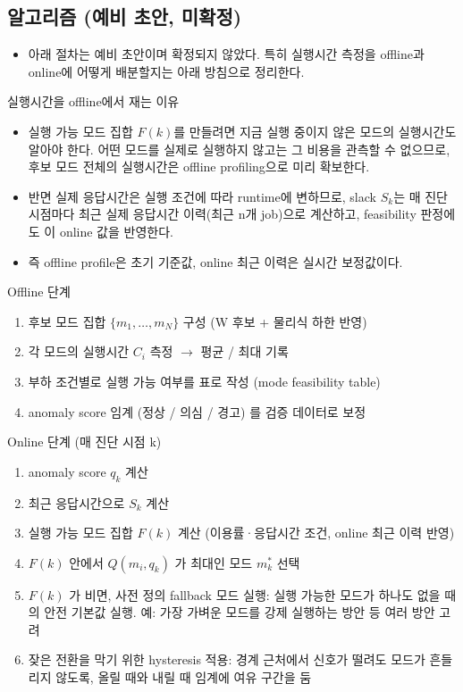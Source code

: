 \documentclass[10pt]{article}
\begin{document}
\subsection{알고리즘 (예비 초안, 미확정)}
\begin{itemize}
\item 아래 절차는 예비 초안이며 확정되지 않았다. 특히 실행시간 측정을 offline과 online에 어떻게 배분할지는 아래 방침으로 정리한다.
\end{itemize}
\noindent 실행시간을 offline에서 재는 이유
\begin{itemize}
\item 실행 가능 모드 집합 $F(k)$를 만들려면 지금 실행 중이지 않은 모드의 실행시간도 알아야 한다. 어떤 모드를 실제로 실행하지 않고는 그 비용을 관측할 수 없으므로, 후보 모드 전체의 실행시간은 offline profiling으로 미리 확보한다.
\item 반면 실제 응답시간은 실행 조건에 따라 runtime에 변하므로, slack $S_k$는 매 진단 시점마다 최근 실제 응답시간 이력(최근 n개 job)으로 계산하고, feasibility 판정에도 이 online 값을 반영한다.
\item 즉 offline profile은 초기 기준값, online 최근 이력은 실시간 보정값이다.
\end{itemize}
\noindent Offline 단계
\begin{enumerate}
\item 후보 모드 집합 $\{m_1, \dots, m_N\}$ 구성 (W 후보 + 물리식 하한 반영)
\item 각 모드의 실행시간 $C_i$ 측정 $\rightarrow$ 평균 / 최대 기록
\item 부하 조건별로 실행 가능 여부를 표로 작성 (mode feasibility table)
\item anomaly score 임계 (정상 / 의심 / 경고) 를 검증 데이터로 보정
\end{enumerate}
\noindent Online 단계 (매 진단 시점 k)
\begin{enumerate}
\item anomaly score $q_k$ 계산
\item 최근 응답시간으로 $S_k$ 계산
\item 실행 가능 모드 집합 $F(k)$ 계산 (이용률·응답시간 조건, online 최근 이력 반영)
\item $F(k)$ 안에서 $Q(m_i, q_k)$ 가 최대인 모드 $m^{*}_k$ 선택
\item $F(k)$ 가 비면, 사전 정의 fallback 모드 실행: 실행 가능한 모드가 하나도 없을 때의 안전 기본값 실행. 예: 가장 가벼운 모드를 강제 실행하는 방안 등 여러 방안 고려
\item 잦은 전환을 막기 위한 hysteresis 적용: 경계 근처에서 신호가 떨려도 모드가 흔들리지 않도록, 올릴 때와 내릴 때 임계에 여유 구간을 둠
\end{enumerate}
\end{document}
